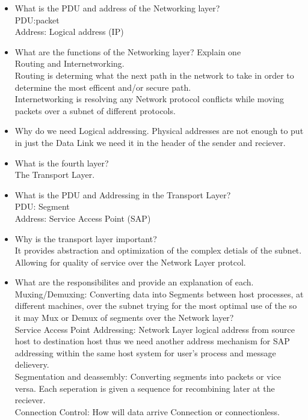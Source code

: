 \begin{itemize}
    \item What is the PDU and address of the Networking layer?\\
    PDU:packet\\
    Address: Logical address (IP)\\

    \item What are the functions of the Networking layer? Explain one\\
    Routing and Internetworking.\\
    Routing is determing what the next path in the network to take in order to 
    determine the most efficent and/or secure path.\\
    Internetworking is resolving any Network protocol conflicts while moving 
    packets over a subnet of different protocols.\\

    \item Why do we need Logical addressing.
    Physical addresses are not enough to put in just the Data Link we need it in the header 
    of the sender and reciever.\\

    \item What is the fourth layer?\\
    The Transport Layer.\\

    \item What is the PDU and Addressing in the Transport Layer?\\
    PDU: Segment\\
    Address: Service Access Point (SAP)\\

    \item Why is the transport layer important?\\
    It provides abstraction and optimization of the complex detials of the subnet. Allowing for quality 
    of service over the Network Layer protcol.\\

    \item What are the responsibilites and provide an explanation of each.\\
    Muxing/Demuxing: Converting data into Segments between host processes, at different 
    machines, over the subnet trying for the most optimal use of the so it may Mux or Demux 
    of segments over the Network layer?\\
    Service Access Point Addressing: Network Layer logical address from source host to destination host
    thus we need another address mechanism for SAP addressing within the same host system for user's 
    process and message delievery.\\
    Segmentation and deassembly: Converting segments into packets or vice versa. Each seperation 
    is given a sequence for recombining later at the reciever.\\
    Connection Control: How will data arrive Connection or connectionless.\\


\end{itemize}
